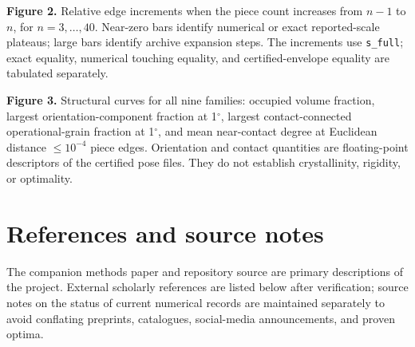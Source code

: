 \documentclass[11pt,a4paper]{article}
\begin{document}
\textbf{Figure 2.} Relative edge increments when the piece count increases from $n-1$ to $n$, for $n=3,\ldots,40$. Near-zero bars identify numerical or exact reported-scale plateaus; large bars identify archive expansion steps. The increments use \nolinkurl{s_full}; exact equality, numerical touching equality, and certified-envelope equality are tabulated separately.

\textbf{Figure 3.} Structural curves for all nine families: occupied volume fraction, largest orientation-component fraction at 1$^{\circ}$, largest contact-connected operational-grain fraction at 1$^{\circ}$, and mean near-contact degree at Euclidean distance $\le10^{-4}$ piece edges. Orientation and contact quantities are floating-point descriptors of the certified pose files. They do not establish crystallinity, rigidity, or optimality.

\section*{References and source notes}

The companion methods paper and repository source are primary descriptions of the project. External scholarly references are listed below after verification; source notes on the status of current numerical records are maintained separately to avoid conflating preprints, catalogues, social-media announcements, and proven optima.
\end{document}
